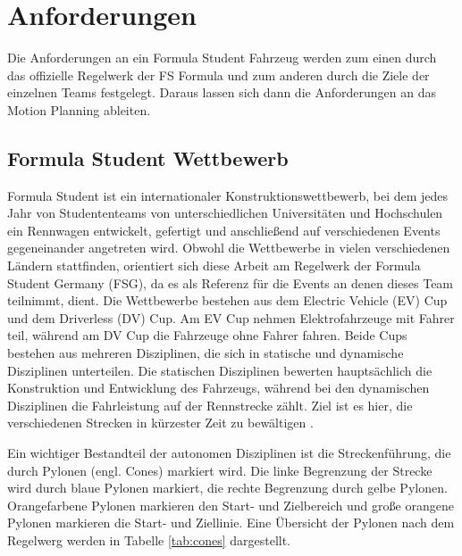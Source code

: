 
\chapter{Anforderungen}

Die Anforderungen an ein Formula Student Fahrzeug werden zum einen durch das 
offizielle Regelwerk der FS Formula und zum anderen durch die Ziele der 
einzelnen Teams festgelegt. Daraus lassen sich dann die Anforderungen an das 
Motion Planning ableiten.

\section{Formula Student Wettbewerb}

Formula Student ist ein internationaler Konstruktionswettbewerb, bei dem jedes 
Jahr von Studententeams von unterschiedlichen Universitäten und Hochschulen 
ein Rennwagen entwickelt, gefertigt und anschließend auf verschiedenen Events 
gegeneinander angetreten wird. Obwohl die Wettbewerbe in vielen verschiedenen 
Ländern stattfinden, orientiert sich diese Arbeit am Regelwerk der Formula Student 
Germany (FSG), da es als Referenz für die Events an denen dieses Team teilnimmt, dient.
Die Wettbewerbe bestehen aus dem Electric Vehicle (EV) Cup und dem Driverless (DV) Cup.
Am EV Cup nehmen Elektrofahrzeuge mit Fahrer teil, während am DV Cup die Fahrzeuge ohne 
Fahrer fahren. Beide Cups bestehen aus mehreren Disziplinen, die sich in statische und 
dynamische Disziplinen unterteilen. Die statischen Disziplinen bewerten hauptsächlich
die Konstruktion und Entwicklung des Fahrzeugs, während bei den dynamischen Disziplinen 
die Fahrleistung auf der Rennstrecke zählt. Ziel ist es hier, die verschiedenen Strecken
in kürzester Zeit zu bewältigen \cite{urlId}.

Ein wichtiger Bestandteil der autonomen Disziplinen ist die Streckenführung, die durch 
Pylonen (engl. Cones) markiert wird. Die linke Begrenzung der Strecke wird durch blaue
Pylonen markiert, die rechte Begrenzung durch gelbe Pylonen. Orangefarbene Pylonen
markieren den Start- und Zielbereich und große orangene Pylonen markieren die Start- 
und Ziellinie. Eine Übersicht der Pylonen nach dem Regelwerg werden in Tabelle 
\ref{tab:cones} dargestellt.

